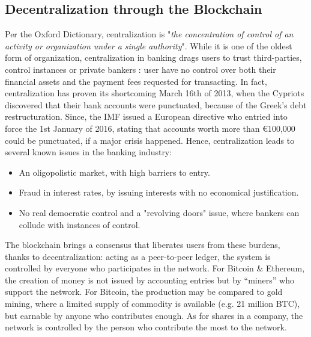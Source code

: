 \documentclass[11pt]{report}
\begin{document}
	\subsection*{Decentralization through the Blockchain}
Per the Oxford Dictionary, centralization is "\textit{the concentration of control of an activity or organization under a single authority}"\cite{OXFORD}. While it is one of the oldest form of organization, centralization in banking drags users to trust third-parties, control instances or private bankers : user have no control over both their financial assets and the payment fees requested for transacting. \newline 
In fact, centralization has proven its shortcoming March 16th of 2013, when the Cypriots discovered that their bank accounts were punctuated, because of the Greek’s debt restructuration. \cite{CYPRIOTS} Since, the IMF issued a European directive who entried into force the 1st January of 2016, stating that accounts worth more than \euro 100,000 could be punctuated, if a major crisis happened\cite{HERLIN}. 
Hence, centralization leads to several known issues in the banking industry: \cite{NOIZAT}
\begin{itemize}
\item An oligopolistic market, with high barriers to entry.
\item Fraud in interest rates, by issuing interests with no economical justification.
\item No real democratic control and a "revolving doors" issue, where bankers can collude with instances of control.
\end{itemize}
The blockchain brings a consensus that liberates users from these burdens, thanks to decentralization: acting as a peer-to-peer ledger, the system is controlled by everyone who participates in the network. For Bitcoin \& Ethereum, the creation of money is not issued by accounting entries but by “miners” who support the network. For Bitcoin, the production may be compared to gold mining, where a limited supply of commodity is available (e.g. 21 million BTC), but earnable by anyone who contributes enough. As for shares in a company, the network is controlled by the person who contribute the most to the network.
\clearpage
\end{document}
